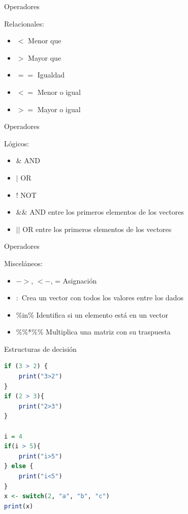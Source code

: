 \documentclass[xcolor=table]{beamer}
\begin{document}
\begin{frame}{Operadores}

Relacionales:

\begin{itemize}
\item $<$ Menor que
\item $>$ Mayor que 
\item $==$ Igualdad
\item $<=$ Menor o igual
\item $>=$ Mayor o igual

\end{itemize}

\end{frame}

\begin{frame}{Operadores}

Lógicos:

\begin{itemize}
\item $\&$ AND
\item $|$ OR 
\item ! NOT
\item $\&\&$ AND entre los primeros elementos de los vectores
\item $| |$ OR entre los primeros elementos de los vectores

\end{itemize}

\end{frame}

\begin{frame}{Operadores}

Misceláneos:

\begin{itemize}
\item $->$, $<-$, = Asignación
\item $:$ Crea un vector con todos los valores entre los dados 
\item   \%in\% Identifica si un elemento está en un vector
\item \%\%*\%\% Multiplica una matriz con su traspuesta


\end{itemize}

\end{frame}

\begin{frame}[fragile]{Estructuras de decisión}
\begin{lstlisting}[language=R, basicstyle=\ttfamily]
if (3 > 2) {
    print("3>2")
}
if (2 > 3){
    print("2>3")
}

i = 4
if(i > 5){
    print("i>5")
} else {
    print("i<5")
}
x <- switch(2, "a", "b", "c")
print(x)
\end{lstlisting}

\end{frame}
\end{document}
